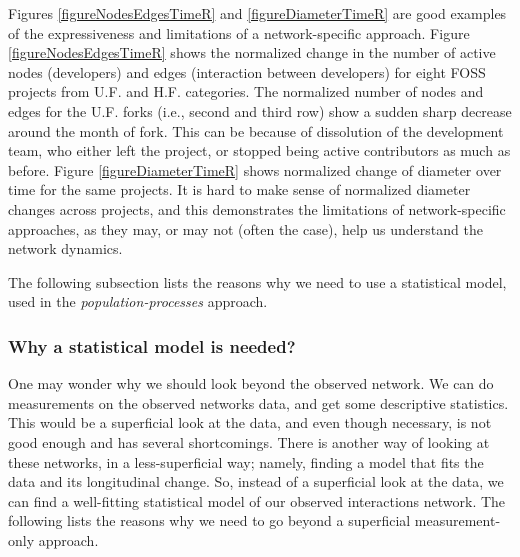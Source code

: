\documentclass[11pt]{report}
\begin{document}
Figures \ref{figureNodesEdgesTimeR} and \ref{figureDiameterTimeR} are good examples of the expressiveness and limitations of a network-specific approach. Figure \ref{figureNodesEdgesTimeR} shows the normalized change in the number of active nodes (developers) and edges (interaction between developers) for eight FOSS projects from U.F. and H.F. categories. The normalized number of nodes and edges for the U.F. forks (i.e., second and third row) show a sudden sharp decrease around the month of fork. This can be because of dissolution of the development team, who either left the project, or stopped being active contributors as much as before. Figure  \ref{figureDiameterTimeR} shows normalized change of diameter over time for the same projects. It is hard to make sense of normalized diameter changes across projects, and this demonstrates the limitations of network-specific approaches, as they may, or may not (often the case), help us understand the network dynamics.

The following subsection lists the reasons why we need to use a statistical model, used in the \textit{population-processes} approach.

\subsubsection{Why a statistical model is needed?}
One may wonder why we should look beyond the observed network. We can do measurements on the observed networks data, and get some descriptive statistics. This would be a superficial look at the data, and even though necessary, is not good enough and has several shortcomings. 
There is another way of looking at these networks, in a less-superficial way; namely, finding a model that fits the data and its longitudinal change. So, instead of a superficial look at the data, we can find a well-fitting statistical model of our observed interactions network. The following lists the reasons why we need to go beyond a superficial measurement-only approach. 
\end{document}
